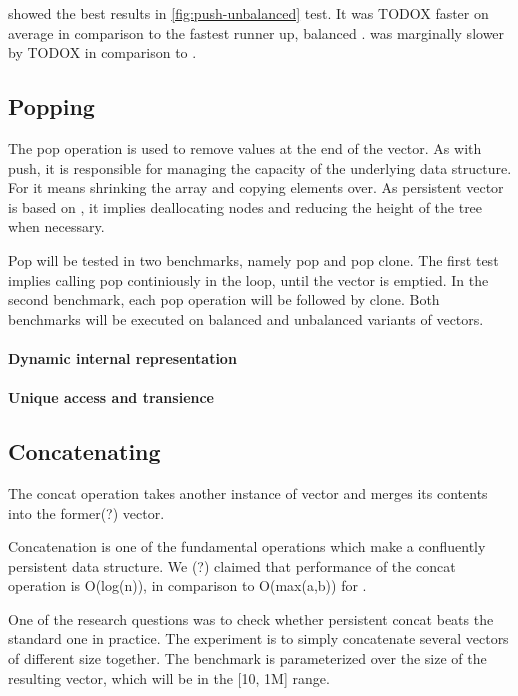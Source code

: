 \stdvec{} showed the best results in \ref{fig:push-unbalanced} test. It was TODOX faster on average in comparison to the fastest runner up, balanced \rrbvec{}. \imrsvec{} was marginally slower by TODOX in comparison to \pvec{}. 

\subsection{Popping}
The pop operation is used to remove values at the end of the vector. As with push, it is responsible for managing the capacity of the underlying data structure. For \stdvec{} it means shrinking the array and copying elements over. As persistent vector is based on \rrbtree{}, it implies deallocating nodes and reducing the height of the tree when necessary. 

Pop will be tested in two benchmarks, namely pop and pop clone. The first test implies calling pop continiously in the loop, until the vector is emptied. In the second benchmark, each pop operation will be followed by clone. Both benchmarks will be executed on balanced and unbalanced variants of vectors. 


\paragraph*{Dynamic internal representation}

\paragraph*{Unique access and transience}

\subsection{Concatenating}
The concat operation takes another instance of vector and merges its contents into the former(?) vector. 

Concatenation is one of the fundamental operations which make \rrbvec{} a confluently persistent data structure. We (?) claimed that performance of the concat operation is O(log(n)), in comparison to O(max(a,b)) for \stdvec{}. 

One of the research questions was to check whether persistent concat beats the standard one in practice. The experiment is to simply concatenate several vectors of different size together. The benchmark is parameterized over the size of the resulting vector, which will be in the [10, 1M] range. 


